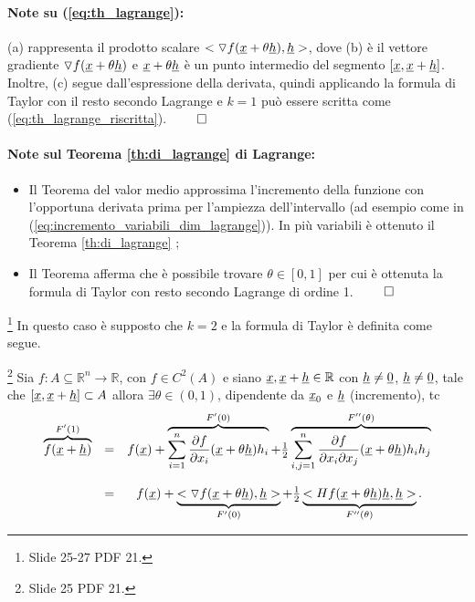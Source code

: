 \paragraph{Note su (\ref{eq:th_lagrange}):} (a) rappresenta il prodotto scalare $<\triangledown f(\uline x + \theta \uline h), \uline h>$, dove (b) è il vettore gradiente $\triangledown f(\uline x + \theta \uline h)$ e $\uline x + \theta \uline h$ è un punto intermedio del segmento $[\uline x, \uline x+\uline h]$. Inoltre, (c) segue dall'espressione della derivata, quindi applicando la formula di Taylor con il resto secondo Lagrange e $k=1$ può essere scritta come (\ref{eq:th_lagrange_riscritta}). $\qed$

\paragraph{Note sul Teorema \ref{th:di_lagrange} di Lagrange:}
\begin{itemize}
	\item Il Teorema del valor medio approssima l'incremento della funzione con l'opportuna derivata prima per l'ampiezza dell'intervallo (ad esempio come in (\ref{eq:incremento_variabili_dim_lagrange})). In più variabili è ottenuto il Teorema \ref{th:di_lagrange} ;
	\item Il Teorema afferma che è possibile trovare $\theta\in[0,1]$ per cui è ottenuta la formula di Taylor con resto secondo Lagrange di ordine 1. $\qed$
\end{itemize}

\footnote{Slide 25-27 PDF 21.} In questo caso è supposto che $k=2$ e la formula di Taylor è definita come segue.

\begin{definition}\footnote{Slide 25 PDF 21.}
	Sia $f:A\subseteq\mathbb{R}^n\rightarrow\mathbb{R}$, con $f\in C^2(A)$ e siano $\uline x, \uline x+\uline h\in\mathbb{R}$ con $\uline h\neq\uline 0$, $\uline h\neq\uline 0$, tale che $[\uline x, \uline x+\uline h] \subset A$ allora $\exists\theta\in(0,1)$, dipendente da $\uline x_0$ e $\uline h$ (incremento), tc
	\begin{equation}\label{eq:formula_taylor_secondo_ordine_resto_peano}
		\begin{matrix}
			\overbrace{f(\uline x+\uline h)}^{F'(1)} &=& f(\uline x) + \overbrace{\sum_{i = 1}^{n} \frac{\partial f}{\partial x_i} (\uline x + \theta \uline h) h_i}^{F'(0)} + \frac{1}{2} \overbrace{\sum_{i,j = 1}^{n} \frac{\partial f}{\partial x_i\partial x_j} (\uline x + \theta \uline h) h_i h_j}^{F''(\theta)} \\\\
			&=& f(\uline x) + \underbrace{<\triangledown f(\uline x + \theta \uline h), \uline h>}_{F'(0)} + \frac{1}{2} \underbrace{<Hf(\uline x + \theta \uline h)\uline h, \uline h>}_{F''(\theta)}.
		\end{matrix}
	\end{equation}
\end{definition}

